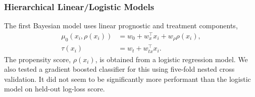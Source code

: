 \documentclass[12pt, a4paper]{article}
\begin{document}




\subsubsection*{Hierarchical Linear/Logistic Models}
\label{sub:hlm}

The first Bayesian model uses linear prognostic and treatment components,
\begin{align*}
  \mu_0(x_i, \rho(x_i)) &= w_0 + w_x^\top x_i + w_\rho \rho(x_i), \\
  \tau(x_i) &= w_t + w_{tx}^\top x_i.
\end{align*}
The propensity score, $\rho(x_i)$, is obtained from a logistic regression
model. We also tested a gradient boosted classifier \citep{friedman2001} for
this using five-fold nested cross validation. It did not seem to be
significantly more performant than the logistic model on held-out log-loss
score.
 
\end{document}
